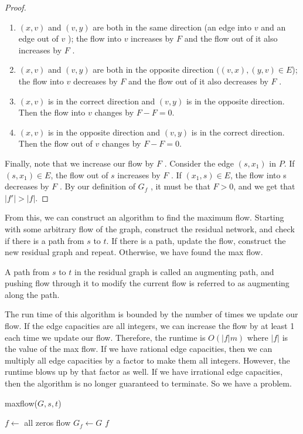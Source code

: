 \documentclass [12pt]{article}
\theoremstyle{definition}
\begin{document}
\begin{proof}
\begin{enumerate}
    \item $(x, v )$ and $(v, y )$ are both in the same direction (an edge into $v$ and an edge out of $v$ ); the flow into $v$ increases by $F$ and the flow out of it also increases by $F$ .
    \item $(x, v )$ and $(v, y )$ are both in the opposite direction $((v, x), (y, v ) \in E$); the flow into $v$ decreases by $F$ and the flow out of it also decreases by $F$ .
    \item $(x, v )$ is in the correct direction and $(v, y )$ is in the opposite direction. Then the flow into $v$ changes by $F - F = 0$.
    \item $(x, v )$ is in the opposite direction and $(v, y )$ is in the correct direction. Then the flow out of $v$ changes by $F - F = 0$. 
\end{enumerate}

Finally, note that we increase our flow by $F$ . Consider the edge $(s, x_1)$ in $P$. If $(s, x_1) \in E$, the flow out of $s$ increases by $F$ . If $(x_1, s) \in E$, the flow into s decreases by $F$ . By our definition of $G_f$ , it must be that $F > 0$, and we get that $|f'| > |f |$. 
\end{proof}

From this, we can construct an algorithm to find the maximum flow. Starting with some arbitrary flow of the graph, construct the residual network, and check if there is a path from $s$ to $t$. If there is a path, update the flow, construct the new residual graph and repeat. Otherwise, we have found the max flow. 

A path from $s$ to $t$ in the residual graph is called an augmenting path, and pushing flow through it to modify the current flow is referred to as augmenting along the path. 

The run time of this algorithm is bounded by the number of times we update our flow. If the edge capacities are all integers, we can increase the flow by at least 1 each time we update our flow. Therefore, the runtime is $O(|f |m)$ where $|f |$ is the value of the max flow. If we have rational edge capacities, then we can multiply all edge capacities by a factor to make them all integers. However, the runtime blows up by that factor as well. If we have irrational edge capacities, then the algorithm is no longer guaranteed to terminate. So we have a problem.

\begin{algorithm}
\caption{maxflow($G,s, t$)}
\label{alg:maxflow_algorithm}
\begin{algorithmic}
\State $f \gets$ all zeros flow
\State $G_f \gets G$
\State {}
\State \Return $f$
\end{algorithmic}
\end{algorithm}
 
\end{document}
